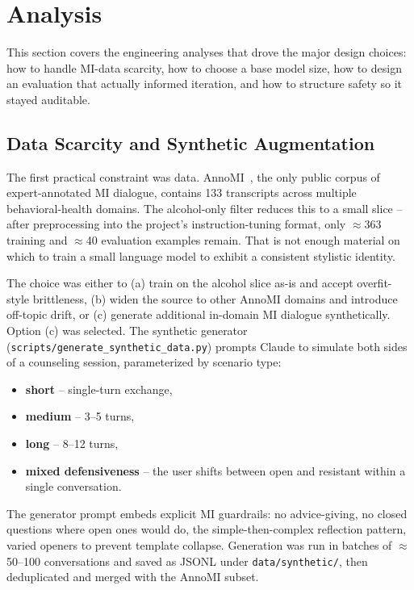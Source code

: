 \section{Analysis}
\label{sec:analysis}

This section covers the engineering analyses that drove the major design
choices: how to handle MI-data scarcity, how to choose a base model size, how
to design an evaluation that actually informed iteration, and how to structure
safety so it stayed auditable.

\subsection{Data Scarcity and Synthetic Augmentation}

The first practical constraint was data. AnnoMI~\cite{wu2022annomi}, the only
public corpus of expert-annotated MI dialogue, contains 133 transcripts across
multiple behavioral-health domains. The alcohol-only filter reduces this to a
small slice -- after preprocessing into the project's instruction-tuning
format, only $\approx$363 training and $\approx$40 evaluation examples remain.
That is not enough material on which to train a small language model to
exhibit a consistent stylistic identity.

The choice was either to (a) train on the alcohol slice as-is and accept
overfit-style brittleness, (b) widen the source to other AnnoMI domains and
introduce off-topic drift, or (c) generate additional in-domain MI dialogue
synthetically. Option (c) was selected. The synthetic generator
(\texttt{scripts/generate\_synthetic\_data.py}) prompts Claude to simulate both
sides of a counseling session, parameterized by scenario type:

\begin{itemize}
    \item \textbf{short} -- single-turn exchange,
    \item \textbf{medium} -- 3--5 turns,
    \item \textbf{long} -- 8--12 turns,
    \item \textbf{mixed defensiveness} -- the user shifts between open and
    resistant within a single conversation.
\end{itemize}

The generator prompt embeds explicit MI guardrails: no advice-giving, no
closed questions where open ones would do, the simple-then-complex reflection
pattern, varied openers to prevent template collapse. Generation was run
in batches of $\approx$50--100 conversations and saved as JSONL under
\texttt{data/synthetic/}, then deduplicated and merged with the AnnoMI subset.


